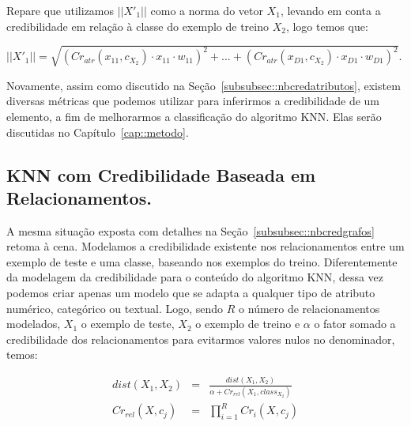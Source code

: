 Repare que utilizamos $||X'_1||$ como a norma do vetor $X_1$, levando em conta a credibilidade em relação à classe do exemplo de treino $X_2$, logo temos que: 

$||X'_1|| = \sqrt{ ( Cr_{atr}(x_{11}, c_{X_2}) \cdot x_{11} \cdot w_{11} )^2 + ... +  ( Cr_{atr}(x_{D1}, c_{X_2}) \cdot x_{D1} \cdot w_{D1} )^2}$.

Novamente, assim como discutido na Seção~\ref{subsubsec::nbcredatributos}, existem diversas métricas que podemos utilizar para inferirmos a credibilidade de um elemento, a fim de melhorarmos a classificação do algoritmo \textsc{KNN}. Elas serão discutidas no Capítulo~\ref{cap::metodo}.

\subsection{\textsc{KNN} com Credibilidade Baseada em Relacionamentos.}
\label{subsubsec::knncredgrafos}

A mesma situação exposta com detalhes na Seção~\ref{subsubsec::nbcredgrafos} retoma à cena. Modelamos a credibilidade existente nos relacionamentos entre um exemplo de teste e uma classe, baseando nos exemplos do treino.
Diferentemente da modelagem da credibilidade para o conteúdo do algoritmo \textsc{KNN}, dessa vez podemos criar apenas um modelo que se adapta a qualquer tipo de atributo numérico, categórico ou textual. Logo, sendo $R$ o número de relacionamentos modelados, $X_1$ o exemplo de teste, $X_2$ o exemplo de treino e $\alpha$ o fator somado a credibilidade dos relacionamentos para evitarmos valores nulos no denominador, temos:

\begin{eqnarray}\label{eqn::distancia_grafos}
    dist(X_1, X_2) & = & \frac{ dist(X_1, X_2) } { \alpha + Cr_{rel}(X_1, class_{X_2}) }\\
    Cr_{rel}(X, c_j) & = & \prod^{R}_{i=1} {Cr_{i}(X,c_j)}
\end{eqnarray}


